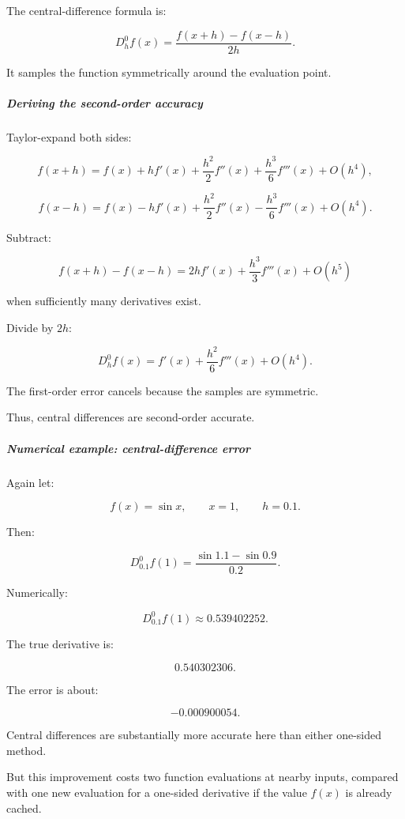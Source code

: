The central-difference formula is:

\[
\boxed{ D_h^0f(x)= \frac{f(x+h)-f(x-h)}{2h} }.
\]

It samples the function symmetrically around the evaluation point.

\subparagraph{Deriving the second-order accuracy}\label{02-foundations-ii-ch025-deriving-the-second-order-accuracy}

\hypertarget{02-foundations-ii-ch025-deriving-the-second-order-accuracy}{}

Taylor-expand both sides:

\[
f(x+h)= f(x)+hf'(x)+ \frac{h^2}{2}f''(x)+ \frac{h^3}{6}f'''(x)+O(h^4),
\]

\[
f(x-h)= f(x)-hf'(x)+ \frac{h^2}{2}f''(x)- \frac{h^3}{6}f'''(x)+O(h^4).
\]

Subtract:

\[
f(x+h)-f(x-h) = 2hf'(x)+\frac{h^3}{3}f'''(x)+O(h^5)
\]

when sufficiently many derivatives exist.

Divide by \(2h\):

\[
\boxed{ D_h^0f(x) = f'(x)+ \frac{h^2}{6}f'''(x)+O(h^4) }.
\]

The first-order error cancels because the samples are symmetric.

Thus, central differences are second-order accurate.

\subparagraph{Numerical example: central-difference error}\label{02-foundations-ii-ch025-numerical-example-central-difference-error}

\hypertarget{02-foundations-ii-ch025-numerical-example-central-difference-error}{}

Again let:

\[
f(x)=\sin x,\qquad x=1,\qquad h=0.1.
\]

Then:

\[
D_{0.1}^0f(1) = \frac{\sin1.1-\sin0.9}{0.2}.
\]

Numerically:

\[
\boxed{ D_{0.1}^0f(1)\approx0.539402252 }.
\]

The true derivative is:

\[
0.540302306.
\]

The error is about:

\[
-0.000900054.
\]

Central differences are substantially more accurate here than either one-sided method.

But this improvement costs two function evaluations at nearby inputs, compared with one new evaluation for a one-sided derivative if the value \(f(x)\) is already cached.

